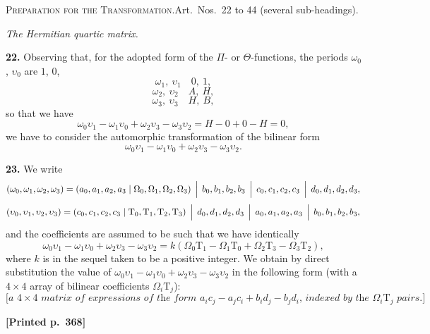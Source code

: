 \documentclass[11pt]{article}
\begin{document}
\medskip

\noindent\textsc{Preparation for the Transformation.}\quad Art.\ Nos.~22 to 44 (several sub-headings).

\medskip
\begin{center}\textit{The Hermitian quartic matrix.}\end{center}

\noindent\textbf{22.} Observing that, for the adopted form of the $\Pi$- or $\Theta$-functions, the periods $\omega_{0}$, $\upsilon_{0}$ are $1$, $0$,
\[
\omega_{1},\ \upsilon_{1}\quad 0,\ 1,
\]
\[
\omega_{2},\ \upsilon_{2}\quad A,\ H,
\]
\[
\omega_{3},\ \upsilon_{3}\quad H,\ B,
\]
so that we have
\[
\omega_{0}\upsilon_{1}-\omega_{1}\upsilon_{0}+\omega_{2}\upsilon_{3}-\omega_{3}\upsilon_{2}=H-0+0-H=0,
\]
we have to consider the automorphic transformation of the bilinear form
\[
\omega_{0}\upsilon_{1}-\omega_{1}\upsilon_{0}+\omega_{2}\upsilon_{3}-\omega_{3}\upsilon_{2}.
\]

\medskip
\noindent\textbf{23.} We write
\[
(\omega_{0},\omega_{1},\omega_{2},\omega_{3})=(a_{0},a_{1},a_{2},a_{3} \mid \Omega_{0},\Omega_{1},\Omega_{2},\Omega_{3})\,\Bigm|\, b_{0},b_{1},b_{2},b_{3}\,\Bigm|\,c_{0},c_{1},c_{2},c_{3}\,\Bigm|\,d_{0},d_{1},d_{2},d_{3},
\]
\[
(\upsilon_{0},\upsilon_{1},\upsilon_{2},\upsilon_{3})=(c_{0},c_{1},c_{2},c_{3} \mid \mathrm{T}_{0},\mathrm{T}_{1},\mathrm{T}_{2},\mathrm{T}_{3})\,\Bigm|\, d_{0},d_{1},d_{2},d_{3}\,\Bigm|\,a_{0},a_{1},a_{2},a_{3}\,\Bigm|\,b_{0},b_{1},b_{2},b_{3},
\]
and the coefficients are assumed to be such that we have identically
\[
\omega_{0}\upsilon_{1}-\omega_{1}\upsilon_{0}+\omega_{2}\upsilon_{3}-\omega_{3}\upsilon_{2}=k(\Omega_{0}\mathrm{T}_{1}-\Omega_{1}\mathrm{T}_{0}+\Omega_{2}\mathrm{T}_{3}-\Omega_{3}\mathrm{T}_{2}),
\]
where $k$ is in the sequel taken to be a positive integer. We obtain by direct substitution the value of $\omega_{0}\upsilon_{1}-\omega_{1}\upsilon_{0}+\omega_{2}\upsilon_{3}-\omega_{3}\upsilon_{2}$ in the following form (with a $4\times 4$ array of bilinear coefficients $\Omega_{i}\mathrm{T}_{j}$):
\[
\textit{[a $4\times 4$ matrix of expressions of the form $a_{i}c_{j}-a_{j}c_{i}+b_{i}d_{j}-b_{j}d_{i}$, indexed by the $\Omega_{i}\mathrm{T}_{j}$ pairs.]}
\]

\medskip
\noindent\textbf{[Printed p.~368]}\hfill
\end{document}
